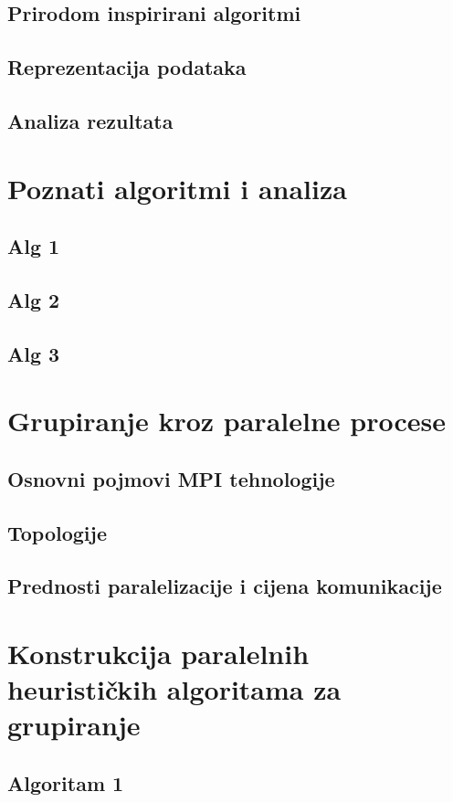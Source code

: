 \documentclass[a4paper,twoside,12pt]{memoir} %
\begin{document}
\section[Prirodom inspirirani algoritmi][prirodni-algoritmi]{Prirodom inspirirani algoritmi}
\section{Reprezentacija podataka}
\section{Analiza rezultata}
\chapter{Poznati algoritmi i analiza}
\section{Alg 1}
\section{Alg 2}
\section{Alg 3}
\chapter{Grupiranje kroz paralelne procese}
\section[Osnovni pojmovi MPI tehnologije][mpi]{Osnovni pojmovi MPI tehnologije}
\section[Topologija][topologija]{Topologije}
\section[Prednosti paralelizacije i cijena komunikacije][pred-man-paralel]{Prednosti paralelizacije i cijena komunikacije}
\chapter{Konstrukcija paralelnih heurističkih algoritama za grupiranje}
\section{Algoritam 1}
\end{document}
